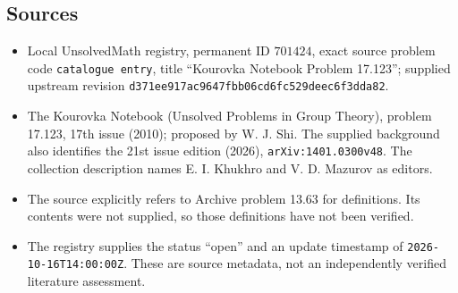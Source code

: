 \documentclass[11pt]{article}
\begin{document}
\subsection{Sources}
\begin{itemize}
\item Local UnsolvedMath registry, permanent ID \(701424\), exact source problem code \texttt{catalogue entry}, title ``Kourovka Notebook Problem 17.123''; supplied upstream revision \texttt{d371ee917ac9647fbb06cd6fc529deec6f3dda82}.
\item The Kourovka Notebook (Unsolved Problems in Group Theory), problem 17.123, 17th issue (2010); proposed by W. J. Shi. The supplied background also identifies the 21st issue edition (2026), \texttt{arXiv:1401.0300v48}. The collection description names E. I. Khukhro and V. D. Mazurov as editors.
\item The source explicitly refers to Archive problem 13.63 for definitions. Its contents were not supplied, so those definitions have not been verified.
\item The registry supplies the status ``open'' and an update timestamp of \texttt{2026-10-16T14:00:00Z}. These are source metadata, not an independently verified literature assessment.
\end{itemize}
\end{document}
